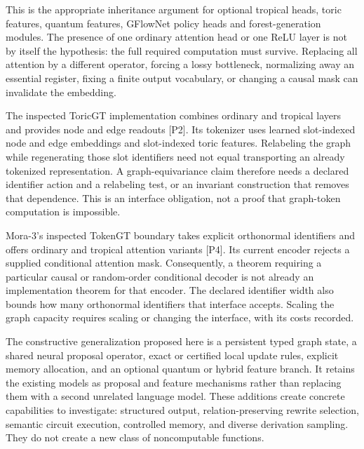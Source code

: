 This is the appropriate inheritance argument for optional tropical heads, toric features, quantum features, GFlowNet policy heads and forest-generation modules. The presence of one ordinary attention head or one ReLU layer is not by itself the hypothesis: the full required computation must survive. Replacing all attention by a different operator, forcing a lossy bottleneck, normalizing away an essential register, fixing a finite output vocabulary, or changing a causal mask can invalidate the embedding.

The inspected ToricGT implementation combines ordinary and tropical layers and provides node and edge readouts [P2]. Its tokenizer uses learned slot-indexed node and edge embeddings and slot-indexed toric features. Relabeling the graph while regenerating those slot identifiers need not equal transporting an already tokenized representation. A graph-equivariance claim therefore needs a declared identifier action and a relabeling test, or an invariant construction that removes that dependence. This is an interface obligation, not a proof that graph-token computation is impossible.

Mora-3's inspected TokenGT boundary takes explicit orthonormal identifiers and offers ordinary and tropical attention variants [P4]. Its current encoder rejects a supplied conditional attention mask. Consequently, a theorem requiring a particular causal or random-order conditional decoder is not already an implementation theorem for that encoder. The declared identifier width also bounds how many orthonormal identifiers that interface accepts. Scaling the graph capacity requires scaling or changing the interface, with its costs recorded.

The constructive generalization proposed here is a persistent typed graph state, a shared neural proposal operator, exact or certified local update rules, explicit memory allocation, and an optional quantum or hybrid feature branch. It retains the existing models as proposal and feature mechanisms rather than replacing them with a second unrelated language model. These additions create concrete capabilities to investigate: structured output, relation-preserving rewrite selection, semantic circuit execution, controlled memory, and diverse derivation sampling. They do not create a new class of noncomputable functions.

